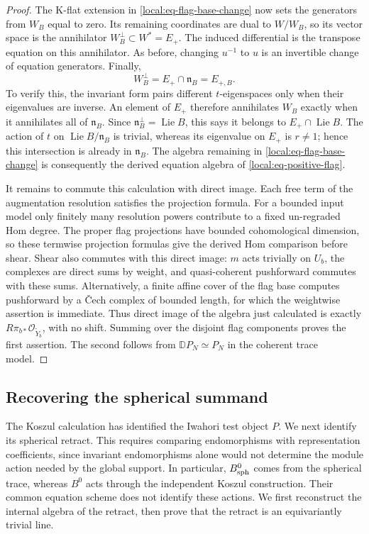 \documentclass[11pt]{article}
\numberwithin{equation}{section}
\theoremstyle{definition}
\theoremstyle{remark}
\newcommand{\cO}{\mathcal O}
\newcommand{\Lie}{\operatorname{Lie}}
\begin{document}
\begin{proof}
The K-flat extension in \eqref{local:eq-flag-base-change} now
sets the generators from $W_B$ equal to zero.  Its remaining
coordinates are dual to $W/W_B$, so its vector space is the
annihilator $W_B^\perp\subset W^*=E_+$.  The induced differential
is the transpose equation on this annihilator.  As before,
changing $u^{-1}$ to $u$ is an invertible change of equation
generators.  Finally,
\begin{equation}\label{local:eq-annihilator}
 W_B^\perp=E_+\cap\mathfrak n_B=E_{+,B}.
\end{equation}
To verify this, the invariant form pairs different $t$-eigenspaces
only when their eigenvalues are inverse.  An element of $E_+$
therefore annihilates $W_B$ exactly when it annihilates all of
$\mathfrak n_B$.  Since
$\mathfrak n_B^\perp=\Lie B$, this says it belongs to
$E_+\cap\Lie B$.  The action of $t$ on
$\Lie B/\mathfrak n_B$ is trivial, whereas its eigenvalue on
$E_+$ is $r\ne1$; hence this intersection is already in
$\mathfrak n_B$.  The algebra remaining in
\eqref{local:eq-flag-base-change} is consequently the derived
equation algebra of \eqref{local:eq-positive-flag}.

It remains to commute this calculation with direct image.
Each free term of the augmentation resolution satisfies the
projection formula.  For a bounded input model only finitely
many resolution powers contribute to a fixed un-regraded Hom
degree.  The proper flag projections have bounded cohomological
dimension, so these termwise projection formulas give the derived
Hom comparison before shear.  Shear also commutes with this
direct image: $m$ acts trivially on $U_b$, the complexes are direct
sums by weight, and quasi-coherent pushforward commutes with these
sums.  Alternatively, a finite affine cover of the flag base
computes pushforward by a \v Cech complex of bounded length, for
which the weightwise assertion is immediate.
Thus direct image of the algebra just calculated is exactly
$R\pi_{b*}\cO_{\widetilde Y_b}$, with no shift.  Summing over
the disjoint flag components proves the first assertion.  The
second follows from $\mathbb D P_N\simeq P_N$ in the coherent
trace model.
\end{proof}

\subsection{Recovering the spherical summand}

The Koszul calculation has identified the Iwahori test object $P$.
We next identify its spherical retract.  This requires comparing
endomorphisms with representation coefficients, since invariant
endomorphisms alone would not determine the module action needed by
the global support.  In particular, $B_{\rm sph}^0$ comes from the
spherical trace, whereas $B^0$ acts through the independent Koszul
construction.  Their common equation scheme does not identify these
actions.  We first reconstruct the internal algebra of the retract,
then prove that the retract is an equivariantly trivial line.
\end{document}
